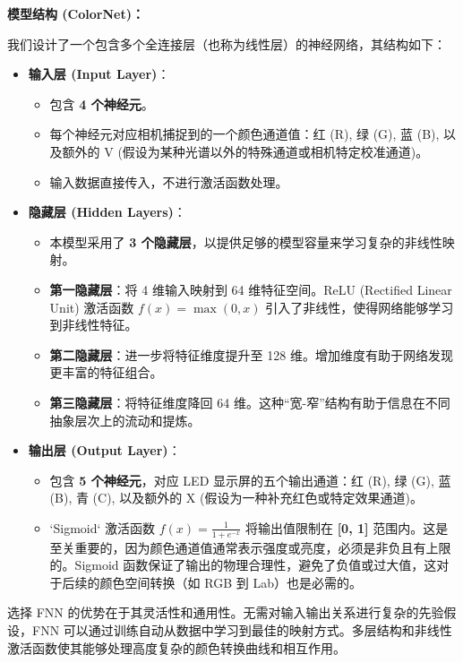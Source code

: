 \textbf{模型结构 (ColorNet)：}

我们设计了一个包含多个全连接层（也称为线性层）的神经网络，其结构如下：

\begin{itemize}
    \item \textbf{输入层 (Input Layer)}：
        \begin{itemize}
            \item 包含 \textbf{4 个神经元}。
            \item 每个神经元对应相机捕捉到的一个颜色通道值：红 (R), 绿 (G), 蓝 (B), 以及额外的 V (假设为某种光谱以外的特殊通道或相机特定校准通道)。
            \item 输入数据直接传入，不进行激活函数处理。
        \end{itemize}
    \item \textbf{隐藏层 (Hidden Layers)}：
        \begin{itemize}
            \item 本模型采用了 \textbf{3 个隐藏层}，以提供足够的模型容量来学习复杂的非线性映射。
            \item \textbf{第一隐藏层}：将 4 维输入映射到 64 维特征空间。ReLU (Rectified Linear Unit) 激活函数 $f(x) = \max(0, x)$ 引入了非线性，使得网络能够学习到非线性特征。
            \item \textbf{第二隐藏层}：进一步将特征维度提升至 128 维。增加维度有助于网络发现更丰富的特征组合。
            \item \textbf{第三隐藏层}：将特征维度降回 64 维。这种“宽-窄”结构有助于信息在不同抽象层次上的流动和提炼。
        \end{itemize}
    \item \textbf{输出层 (Output Layer)}：
        \begin{itemize}
            \item 包含 \textbf{5 个神经元}，对应 LED 显示屏的五个输出通道：红 (R), 绿 (G), 蓝 (B), 青 (C), 以及额外的 X (假设为一种补充红色或特定效果通道)。
            \item `Sigmoid` 激活函数 $f(x) = \frac{1}{1+e^{-x}}$ 将输出值限制在 \textbf{[0, 1]} 范围内。这是至关重要的，因为颜色通道值通常表示强度或亮度，必须是非负且有上限的。Sigmoid 函数保证了输出的物理合理性，避免了负值或过大值，这对于后续的颜色空间转换（如 RGB 到 Lab）也是必需的。
        \end{itemize}
\end{itemize}

选择 FNN 的优势在于其灵活性和通用性。无需对输入输出关系进行复杂的先验假设，FNN 可以通过训练自动从数据中学习到最佳的映射方式。多层结构和非线性激活函数使其能够处理高度复杂的颜色转换曲线和相互作用。

